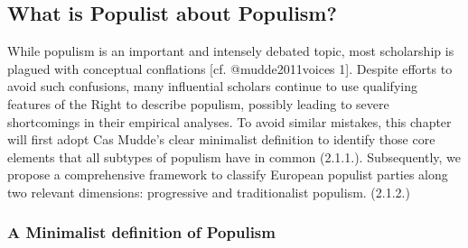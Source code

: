 \documentclass[]{article}
\title{}
\author{}
\date{}
\begin{document}
\subsection{What is Populist about
Populism?}\label{what-is-populist-about-populism}

While populism is an important and intensely debated topic, most
scholarship is plagued with conceptual conflations {[}cf.
@mudde2011voices 1{]}. Despite efforts to avoid such confusions, many
influential scholars continue to use qualifying features of the Right to
describe populism, possibly leading to severe shortcomings in their
empirical analyses. To avoid similar mistakes, this chapter will first
adopt Cas Mudde's clear minimalist definition to identify those core
elements that all subtypes of populism have in common (2.1.1.).
Subsequently, we propose a comprehensive framework to classify European
populist parties along two relevant dimensions: progressive and
traditionalist populism. (2.1.2.)

\subsubsection{A Minimalist definition of
Populism}\label{a-minimalist-definition-of-populism}
\end{document}
